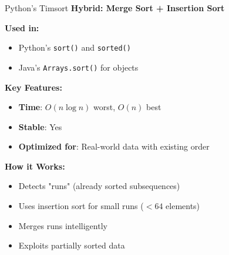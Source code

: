 \documentclass[aspectratio=169]{beamer}
\begin{document}
\begin{frame}{Python's Timsort}
  \textbf{Hybrid: Merge Sort + Insertion Sort}

  \vspace{0.3cm}
  \textbf{Used in:}
  \begin{itemize}
    \item Python's \texttt{sort()} and \texttt{sorted()}
    \item Java's \texttt{Arrays.sort()} for objects
  \end{itemize}

  \vspace{0.3cm}
  \textbf{Key Features:}
  \begin{itemize}
    \item \textbf{Time}: $O(n \log n)$ worst, $O(n)$ best
    \item \textbf{Stable}: Yes
    \item \textbf{Optimized for}: Real-world data with existing order
  \end{itemize}

  \vspace{0.3cm}
  \textbf{How it Works:}
  \begin{itemize}
    \item Detects "runs" (already sorted subsequences)
    \item Uses insertion sort for small runs ($< 64$ elements)
    \item Merges runs intelligently
    \item Exploits partially sorted data
  \end{itemize}
\end{frame}
\end{document}
